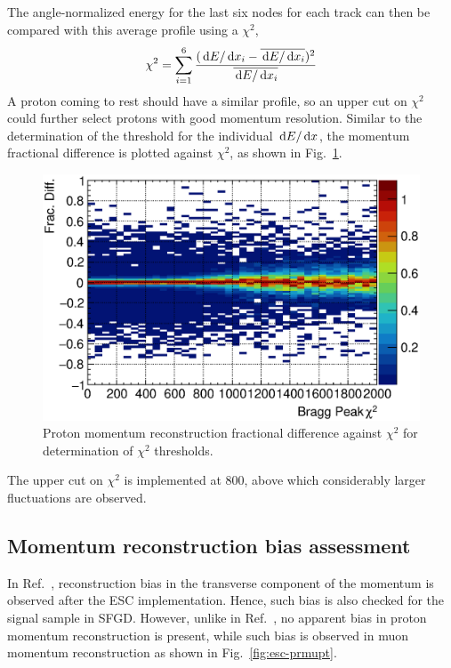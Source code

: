      The angle-normalized energy for the last six nodes for each track can then be compared with this average profile using a $\chi^2$,
    \begin{equation}
    \chi^2 = \sum_{i=1}^{6} \frac{(\,\textrm{d}E/\,\textrm{d}x_i - \overline{\,\textrm{d}E/\,\textrm{d}x_i})^2}{\overline{\,\textrm{d}E/\,\textrm{d}x_i}}
    \end{equation}
    A proton coming to rest should have a similar profile, so an upper cut on $\chi^2$ could further select protons with good momentum resolution. 
    Similar to the determination of the threshold for the individual $\,\textrm{d}E/\,\textrm{d}x$, the momentum fractional difference is plotted against $\chi^2$, as shown in Fig.~\ref{fig:esc-mom-res-chi2}.
    \begin{figure}[h]
       \centering
       \includegraphics[width=\sgfidwid\textwidth]{figures/sel/fig55.eps} 
       \caption{Proton momentum reconstruction fractional difference against $\chi^2$ for determination of $\chi^2$ thresholds.}
       \label{fig:esc-mom-res-chi2}
    \end{figure}
    The upper cut on $\chi^2$ is implemented at $800$, above which considerably larger fluctuations are observed.

    \subsection{Momentum reconstruction bias assessment}
    \label{sec:sel-esc-bias}
     In Ref.~\cite{Lu:2016mjf}, reconstruction bias in the transverse component of the momentum is observed after the ESC implementation.
     Hence, such bias is also checked for the signal sample in SFGD.
     However, unlike in Ref.~\cite{Lu:2016mjf}, no apparent bias in proton momentum reconstruction is present, while such bias is observed in muon momentum reconstruction as shown in Fig.~\ref{fig:esc-prmupt}.

